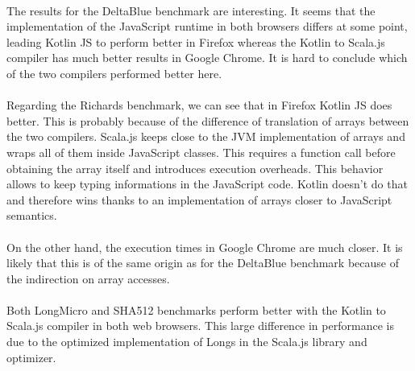 \paragraph{} The results for the DeltaBlue benchmark are interesting. It seems that the implementation of the JavaScript runtime in both browsers differs at some point, leading Kotlin JS to perform better in Firefox whereas the Kotlin to Scala.js compiler has much better results in Google Chrome. It is hard to conclude which of the two compilers performed better here.

\paragraph{} Regarding the Richards benchmark, we can see that in Firefox Kotlin JS does better. This is probably because of the difference of translation of arrays between the two compilers. Scala.js keeps close to the JVM implementation of arrays and wraps all of them inside JavaScript classes. This requires a function call before obtaining the array itself and introduces execution overheads. This behavior allows to keep typing informations in the JavaScript code. Kotlin doesn't do that and therefore wins thanks to an implementation of arrays closer to JavaScript semantics.

\paragraph{} On the other hand, the execution times in Google Chrome are much closer. It is likely that this is of the same origin as for the DeltaBlue benchmark because of the indirection on array accesses.

\paragraph{} Both LongMicro and SHA512 benchmarks perform better with the Kotlin to Scala.js compiler in both web browsers. This large difference in performance is due to the optimized implementation of Longs in the Scala.js library and optimizer.
